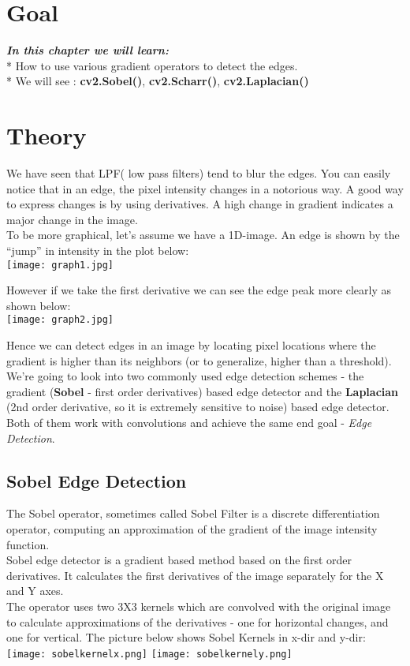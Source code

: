 \documentclass[]{article}
\date{}
\begin{document}
\section{Goal}\label{goal}

\emph{\textbf{In this chapter we will learn:}} \\
* How to use various
gradient operators to detect the edges. \\
* We will see :
\textbf{cv2.Sobel()}, \textbf{cv2.Scharr()}, \textbf{cv2.Laplacian()}

\section{Theory}\label{theory}

We have seen that LPF( low pass filters) tend to blur the edges. You can
easily notice that in an edge, the pixel intensity changes in a
notorious way. A good way to express changes is by using derivatives. A
high change in gradient indicates a major change in the image.\\
To be more graphical, let's assume we have a 1D-image. An edge is shown
by the ``jump'' in intensity in the plot below:\\
\texttt{[image: graph1.jpg]}

However if we take the first derivative we can see the edge peak more
clearly as shown below:\\
\texttt{[image: graph2.jpg]}

Hence we can detect edges in an image by locating pixel locations where
the gradient is higher than its neighbors (or to generalize, higher than
a threshold).\\
We're going to look into two commonly used edge detection schemes - the
gradient (\textbf{Sobel} - first order derivatives) based edge detector
and the \textbf{Laplacian} (2nd order derivative, so it is extremely
sensitive to noise) based edge detector. Both of them work with
convolutions and achieve the same end goal - \emph{Edge Detection}.

\subsection{Sobel Edge Detection}\label{sobel-edge-detection}

The Sobel operator, sometimes called Sobel Filter is a discrete
differentiation operator, computing an approximation of the gradient of
the image intensity function.\\
Sobel edge detector is a gradient based method based on the first order
derivatives. It calculates the first derivatives of the image separately
for the X and Y axes.\\
The operator uses two 3X3 kernels which are convolved with the original
image to calculate approximations of the derivatives - one for
horizontal changes, and one for vertical. The picture below shows Sobel
Kernels in x-dir and y-dir:\\
\texttt{[image: sobelkernelx.png]}
\texttt{[image: sobelkernely.png]}
\end{document}
